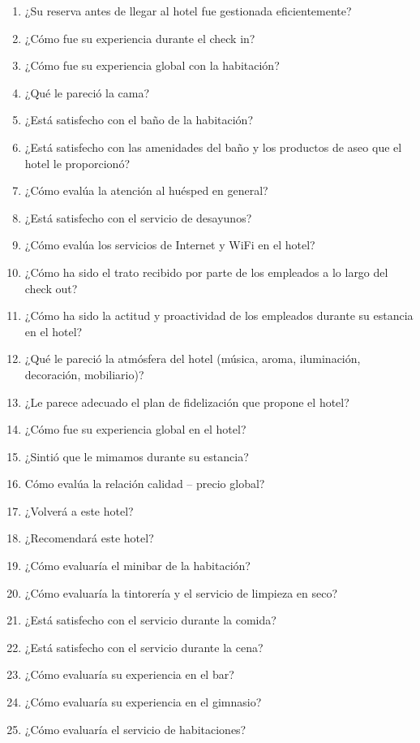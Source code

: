 \begin{enumerate}
	\item ¿Su reserva antes de llegar al hotel fue gestionada eficientemente?
	\item ¿Cómo fue su experiencia durante el check in?
	\item ¿Cómo fue su experiencia global con la habitación?
	\item ¿Qué le pareció la cama?
	\item ¿Está satisfecho con el baño de la habitación?
	\item ¿Está satisfecho con las amenidades del baño y los productos de aseo que el hotel le proporcionó?
	\item ¿Cómo evalúa la atención al huésped en general?
	\item ¿Está satisfecho con el servicio de desayunos?
	\item ¿Cómo evalúa los servicios de Internet y WiFi en el hotel?
	\item ¿Cómo ha sido el trato recibido por parte de los empleados a lo largo del check out?
	\item ¿Cómo ha sido la actitud y proactividad de los empleados durante su estancia en el hotel?
	\item ¿Qué le pareció la atmósfera del hotel (música, aroma, iluminación, decoración, mobiliario)?
	\item ¿Le parece adecuado el plan de fidelización que propone el hotel?
	\item ¿Cómo fue su experiencia global en el hotel?
	\item ¿Sintió que le mimamos durante su estancia?
	\item Cómo evalúa la relación calidad – precio global?
	\item ¿Volverá a este hotel?
	\item ¿Recomendará este hotel?
	\item ¿Cómo evaluaría el minibar de la habitación?
	\item ¿Cómo evaluaría la tintorería y el servicio de limpieza en seco?
	\item ¿Está satisfecho con el servicio durante la comida?
	\item ¿Está satisfecho con el servicio durante la cena?
	\item ¿Cómo evaluaría su experiencia en el bar?
	\item ¿Cómo evaluaría su experiencia en el gimnasio?
	\item ¿Cómo evaluaría el servicio de habitaciones?

\end{enumerate}


